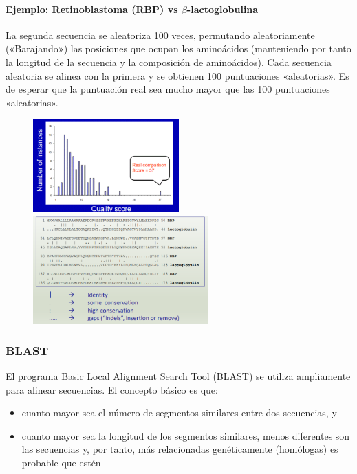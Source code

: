 \paragraph{Ejemplo: Retinoblastoma (RBP) vs $\beta$-lactoglobulina}
La segunda secuencia se aleatoriza 100 veces, permutando aleatoriamente («Barajando») las posiciones que ocupan los aminoácidos (manteniendo por tanto la longitud de la secuencia y la composición de aminoácidos). Cada secuencia aleatoria se alinea con la primera y se obtienen 100 puntuaciones «aleatorias». Es de esperar que la puntuación real sea mucho mayor que las 100 puntuaciones «aleatorias».
\begin{figure}[h]
\centering
\includegraphics[width = 0.5\textwidth]{figs/shuffling.png}
\includegraphics[width = 0.6\textwidth]{figs/alignment-ex.png}
\end{figure}

\subsubsection{BLAST}
El programa Basic Local Alignment Search Tool (BLAST) se utiliza ampliamente para alinear secuencias. El concepto básico es que:
\begin{itemize}
\item cuanto mayor sea el número de segmentos similares entre dos secuencias, y
\item cuanto mayor sea la longitud de los segmentos similares, menos diferentes son las secuencias y, por tanto, más relacionadas genéticamente (homólogas) es probable que estén
\end{itemize}

